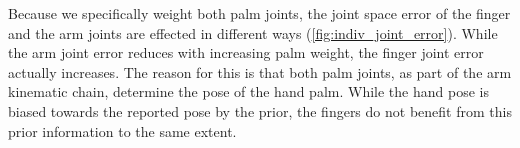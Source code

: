 

Because we specifically weight both palm joints, the joint space error of the finger and the arm joints are effected in different ways (\cref{fig:indiv_joint_error}). While the arm joint error reduces with increasing palm weight, the finger joint error actually increases. The reason for this is that both palm joints, as part of the arm kinematic chain, determine the pose of the hand palm. While the hand pose is biased towards the reported pose by the prior, the fingers do not benefit from this prior information to the same extent.



